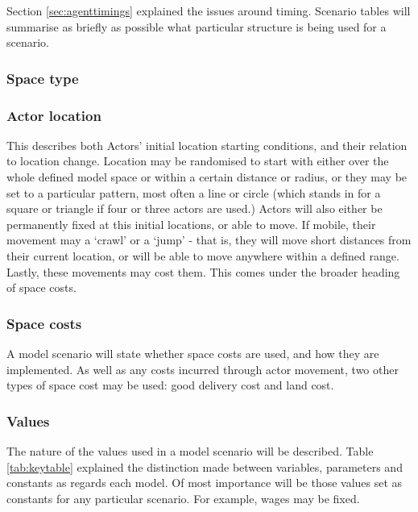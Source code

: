 Section \ref{sec:agenttimings} explained the issues around timing. Scenario tables will summarise as briefly as possible what particular structure is being used for a scenario. 

\subsubsection{Space type}


\subsubsection{Actor location}

This describes both Actors' initial location starting conditions, and their relation to location change. Location may be randomised to start with either over the whole defined model space or within a certain distance or radius, or they may be set to a particular pattern, most often a line or circle (which stands in for a square or triangle if four or three actors are used.) Actors will also either be permanently fixed at this initial locations, or able to move. If mobile, their movement may a `crawl' or a `jump' - that is, they will move short distances from their current location, or will be able to move anywhere within a defined range. Lastly, these movements may cost them. This comes under the broader heading of space costs.

\subsubsection{Space costs}

A model scenario will state whether space costs are used, and how they are implemented. As well as any costs incurred through actor movement, two other types of space cost may be used: good delivery cost and land cost. 

\subsubsection{Values}

The nature of the values used in a model scenario will be described. Table \ref{tab:keytable} explained the distinction made between variables, parameters and constants as regards each model. Of most importance will be those values set as constants for any particular scenario. For example, wages may be fixed.

